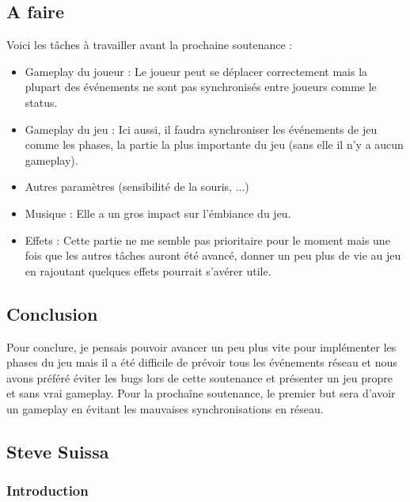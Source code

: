 \documentclass{article}
\begin{document}
\newpage
\subsection{A faire}

Voici les tâches à travailler avant la prochaine soutenance :

\begin{itemize}
\item Gameplay du joueur : Le joueur peut se déplacer correctement mais la plupart des événements ne sont pas synchronisés entre joueurs comme le status.
\item Gameplay du jeu : Ici aussi, il faudra synchroniser les événements de jeu comme les phases, la partie la plus importante du jeu (sans elle il n'y a aucun gameplay).
\item Autres paramètres (sensibilité de la souris, ...)
\item Musique : Elle a un gros impact sur l'émbiance du jeu.
\item Effets : Cette partie ne me semble pas prioritaire pour le moment mais une fois que les autres tâches auront été avancé, donner un peu plus de vie au jeu en rajoutant quelques effets pourrait s'avérer utile.
\end{itemize}


\subsection{Conclusion}

Pour conclure, je pensais pouvoir avancer un peu plus vite pour implémenter les phases du jeu mais il a été difficile de prévoir tous les événements réseau et nous avons préféré éviter les bugs lors de cette soutenance et présenter un jeu propre et sans vrai gameplay.
Pour la prochaîne soutenance, le premier but sera d'avoir un gameplay en évitant les mauvaises synchronisations en réseau.





 
\newpage
\subsection{Steve Suissa}


\subsubsection{Introduction}
\end{document}
